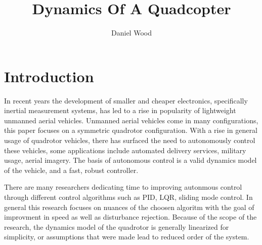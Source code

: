 \documentclass[9pt]{article}
\begin{document}
\title{Dynamics Of A Quadcopter}
\author{Daniel Wood}
\maketitle
\section{Introduction}

In recent years the development of smaller and cheaper electronics, specifically inertial measurement systems, has led to a rise in popularity of lightweight unmanned aerial vehicles. Unmanned aerial vehicles come in many configurations, this paper focuses on a symmetric quadrotor configuration. With a rise in general usage of quadrotor vehicles, there has surfaced the need to autonomously control these vehicles, some applications include automated delivery services, military usage, aerial imagery. The basis of autonomous control is a valid dynamics model of the vehicle, and a fast, robust controller.

There are many researchers dedicating time to improving autonmous control through different control algorithms such as PID, LQR, sliding mode control. In general this research focuses on nuances of the choosen algoritm with the goal of improvment in speed as well as disturbance rejection\cite{DenisKotarski2016CDFU}. Because of the scope of the research, the dynamics model of the quadrotor is generally linearized for simplicity, or assumptions that were made lead to reduced order of the system\cite{FarameeVeeravat2014EotS}.


\end{document}

